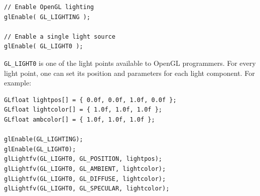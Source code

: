 \begin{lstlisting}[caption={Lighting example}, label={code:lighting}, frame=trBL]
// Enable OpenGL lighting
glEnable( GL_LIGHTING );

// Enable a single light source
glEnable( GL_LIGHT0 );
\end{lstlisting}

\texttt{GL\_LIGHT0} is one of the light points available to 
OpenGL programmers. For every light point, one can set its 
position and parameters for each light component. For example:

\begin{lstlisting}[caption={Complex lighting example}, label={code:complexlighting}, frame=trBL]
GLfloat lightpos[] = { 0.0f, 0.0f, 1.0f, 0.0f };
GLfloat lightcolor[] = { 1.0f, 1.0f, 1.0f };
GLfloat ambcolor[] = { 1.0f, 1.0f, 1.0f };

glEnable(GL_LIGHTING);
glEnable(GL_LIGHT0);                        
glLightfv(GL_LIGHT0, GL_POSITION, lightpos);
glLightfv(GL_LIGHT0, GL_AMBIENT, lightcolor);
glLightfv(GL_LIGHT0, GL_DIFFUSE, lightcolor);
glLightfv(GL_LIGHT0, GL_SPECULAR, lightcolor);
\end{lstlisting}

